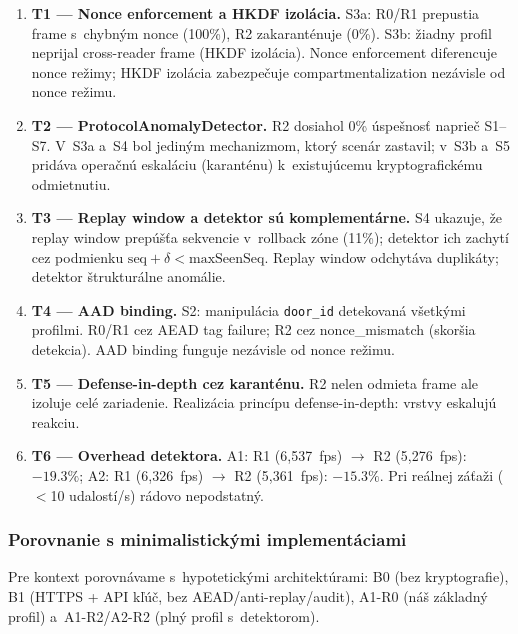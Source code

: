 \begin{enumerate}[leftmargin=*,itemsep=3pt]

\item \textbf{T1 --- Nonce enforcement a HKDF izolácia.} S3a: R0/R1 prepustia frame s~chybným nonce (100\%), R2 zakaranténuje (0\%). S3b: žiadny profil neprijal cross-reader frame (HKDF izolácia). Nonce enforcement diferencuje nonce režimy; HKDF izolácia zabezpečuje compartmentalization nezávisle od nonce režimu\cite{RogawayNonceMisuse2004,RFC5869}.

\item \textbf{T2 --- ProtocolAnomalyDetector.} R2 dosiahol 0\% úspešnosť naprieč S1--S7. V~S3a a~S4 bol jediným mechanizmom, ktorý scenár zastavil; v~S3b a~S5 pridáva operačnú eskaláciu (karanténu) k~existujúcemu kryptografickému odmietnutiu.

\item \textbf{T3 --- Replay window a detektor sú komplementárne.} S4 ukazuje, že replay window prepúšťa sekvencie v~rollback zóne (11\%); detektor ich zachytí cez podmienku $\text{seq} + \delta < \text{maxSeenSeq}$. Replay window odchytáva duplikáty; detektor štrukturálne anomálie\cite{NIST80053,DefenseInDepth}.

\item \textbf{T4 --- AAD binding.} S2: manipulácia \texttt{door\_id} detekovaná všetkými profilmi. R0/R1 cez AEAD tag failure; R2 cez nonce\_mismatch (skoršia detekcia). AAD binding funguje nezávisle od nonce režimu.

\item \textbf{T5 --- Defense-in-depth cez karanténu.} R2 nelen odmieta frame ale izoluje celé zariadenie. Realizácia princípu defense-in-depth\cite{DefenseInDepth}: vrstvy eskalujú reakciu.

\item \textbf{T6 --- Overhead detektora.} A1: R1 (6{,}537~fps) $\rightarrow$ R2 (5{,}276~fps): $-19.3\%$; A2: R1 (6{,}326~fps) $\rightarrow$ R2 (5{,}361~fps): $-15.3\%$. Pri reálnej záťaži ($<$10 udalostí/s) rádovo nepodstatný\cite{NIST80094}.

\end{enumerate}

\subsubsection{Porovnanie s minimalistickými implementáciami}
\label{sec:baseline_comparison}

Pre kontext porovnávame s~hypotetickými architektúrami: B0 (bez kryptografie), B1 (HTTPS + API kľúč, bez AEAD/anti-replay/audit), A1-R0 (náš základný profil) a~A1-R2/A2-R2 (plný profil s~detektorom).

